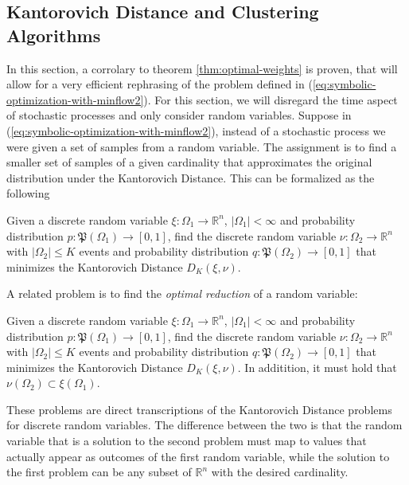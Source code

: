 \subsection{Kantorovich Distance and Clustering Algorithms}
In this section, a corrolary to theorem \ref{thm:optimal-weights} is proven, that will allow for a very efficient rephrasing of the problem defined in (\ref{eq:symbolic-optimization-with-minflow2}).
For this section, we will disregard the time aspect of stochastic processes and only consider random variables.
Suppose in (\ref{eq:symbolic-optimization-with-minflow2}), instead of a stochastic process we were given a set of samples from a random variable.
The assignment is to find a smaller set of samples of a given cardinality that approximates the original distribution under the Kantorovich Distance.
This can be formalized as the following
\begin{problem}
\label{prb:CE-Kantorovich-randvar}
  Given a discrete random variable $\xi :\Omega_1\rightarrow \mathbb{R}^n$, $|\Omega_1|<\infty$ and probability distribution $p:\mathfrak{P}(\Omega_1)\rightarrow [0,1]$, find the discrete random variable $\nu : \Omega_2\rightarrow\mathbb{R}^n$ with $|\Omega_2 | \leq K$ events and probability distribution $q:\mathfrak{P}(\Omega_2)\rightarrow [0,1]$ that minimizes the Kantorovich Distance $D_K(\xi,\nu)$.
\end{problem}
A related problem is to find the \textit{optimal reduction} of a random variable:
\begin{problem}
  \label{prb:DE-Kantorovich-randvar}
  Given a discrete random variable $\xi : \Omega_1\rightarrow \mathbb{R}^n$, $|\Omega_1|<\infty$ and probability distribution $p:\mathfrak{P}(\Omega_1)\rightarrow [0,1]$, find the discrete random variable $\nu : \Omega_2\rightarrow\mathbb{R}^n$ with $|\Omega_2 | \leq K$ events and probability distribution $q:\mathfrak{P}(\Omega_2)\rightarrow [0,1]$ that minimizes the Kantorovich Distance $D_K(\xi,\nu)$.
  In additition, it must hold that $\nu(\Omega_2)\subset\xi(\Omega_1)$.
\end{problem}
These problems are direct transcriptions of the Kantorovich Distance problems for discrete random variables.
The difference between the two is that the random variable that is a solution to the second problem must map to values that actually appear as outcomes of the first random variable,
while the solution to the first problem can be any subset of $\mathbb{R}^n$ with the desired cardinality.


